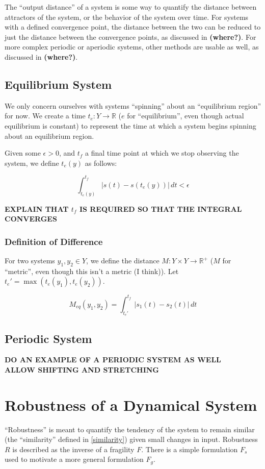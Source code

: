 \documentclass{article}
\begin{document}
The ``output distance'' of a system is some way to quantify the distance between attractors of the system, or the behavior of the system over time. For systems with a defined convergence point, the distance between the two can be reduced to just the distance between the convergence points, as discussed in \textbf{(where?)}. For more complex periodic or aperiodic systems, other methods are usable as well, as discussed in \textbf{(where?)}.

\subsection{Equilibrium System}
We only concern ourselves with systems ``spinning'' about an ``equilibrium region'' for now. We create a time $t_e : Y \to \mathbb{R}$ ($e$ for ``equilibrium'', even though actual equilibrium is constant) to represent the time at which a system begins spinning about an equilibrium region.

Given some $\epsilon > 0$, and $t_f$ a final time point at which we stop observing the system, we define $t_e(y)$ as follows:

\begin{equation}
  \int_{t_e(y)}^{t_f} \lvert s(t) - s(t_e(y)) \rvert\, dt < \epsilon \label{t_e}
\end{equation}

\textbf{EXPLAIN THAT $t_f$ IS REQUIRED SO THAT THE INTEGRAL CONVERGES}

\subsubsection{Definition of Difference}
For two systems $y_1, y_2 \in Y$, we define the distance $M : Y \times Y \to \mathbb{R}^+$ ($M$ for ``metric'', even though this isn't a metric (I think)). Let $t_e' = \max(t_e(y_1),t_e(y_2))$.

\begin{equation}
  M_{eq}(y_1, y_2) = \int_{t_e'}^{t_f} \lvert s_1(t) - s_2(t) \rvert\, dt \label{distance}
\end{equation}

\subsection{Periodic System}
\textbf{DO AN EXAMPLE OF A PERIODIC SYSTEM AS WELL \\
  ALLOW SHIFTING AND STRETCHING}

\section{Robustness of a Dynamical System} \label{robustness}
``Robustness'' is meant to quantify the tendency of the system to remain similar (the ``similarity'' defined in \ref{similarity}) given small changes in input. Robustness $R$ is described as the inverse of a fragility $F$. There is a simple formulation $F_s$ used to motivate a more general formulation $F_g$.
\end{document}
